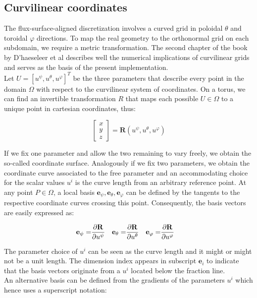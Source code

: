 \subsection{Curvilinear coordinates}
\label{ssec:MetricCurvilinearCoordinates}

The flux-surface-aligned discretization involves a curved grid in poloidal $\theta$ and toroidal $\varphi$ directions. To map the real geometry to the orthonormal grid on each subdomain, we require a metric transformation. The second chapter of the book by D’haeseleer et al \cite{CurvilinearGrids} describes well the numerical implications of curvilinear grids and serves as the basis of the present implementation. \\

Let $U=[u^\psi, u^\theta, u^\varphi]^T$ be the three parameters that describe every point in the domain $\Omega$ with respect to the curvilinear system of coordinates. On a torus, we can find an invertible transformation $R$ that maps each possible $U\in\Omega$ to a unique point in cartesian coordinates, thus: 

\begin{equation}
	\begin{bmatrix} x \\ y \\ z\end{bmatrix} = \mathbf{R}(u^\psi, u^\theta, u^\varphi)
\end{equation}

If we fix one parameter and allow the two remaining to vary freely, we obtain the so-called coordinate surface. Analogously if we fix two parameters, we obtain the coordinate curve associated to the free parameter and an accommodating choice for the scalar values $u^i$ is the curve length from an arbitrary reference point. At any point $P\in\Omega$, a local basis ${\mathbf{e}_\psi, \mathbf{e}_\theta, \mathbf{e}_\varphi}$ can be defined by the tangents to the respective coordinate curves crossing this point. Consequently, the basis vectors are easily expressed as:

\begin{align}
	\mathbf{e}_\psi =& \pdv{\mathbf{R}}{u^\psi} & \mathbf{e}_\theta =& \pdv{\mathbf{R}}{u^\theta} & \mathbf{e}_\varphi =& \pdv{\mathbf{R}}{u^\varphi}
\end{align}

The parameter choice of $u^i$ can be seen as the curve length and it might or might not be a unit length. The dimension index appears in subscript $\mathbf{e}_i$ to indicate that the basis vectors originate from a $u^i$ located below the fraction line. \\
An alternative basis can be defined from the gradients of the parameters $u^i$ which hence uses a superscript notation:  

